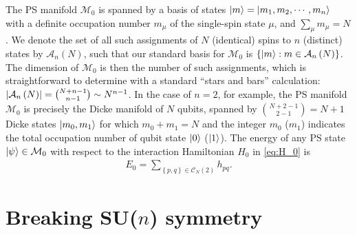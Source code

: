 \documentclass[nofootinbib,notitlepage,11pt]{revtex4-2}
\newcommand{\p}[1]{\left(#1\right)} %
\renewcommand{\set}[1]{\left\{#1\right\}} %
\newcommand{\1}{\mathds{1}}
\newcommand{\A}{\mathcal{A}}
\newcommand{\C}{\mathcal{C}}
\newcommand{\M}{\mathcal{M}}
\begin{document}
The PS manifold $\M_0$ is spanned by a basis of states
$\ket{m}=\ket{m_1,m_2,\cdots,m_n}$ with a definite occupation number
$m_\mu$ of the single-spin state $\mu$, and $\sum_\mu m_\mu=N$.  We
denote the set of all such assignments of $N$ (identical) spins to $n$
(distinct) states by $\A_n\p{N}$, such that our standard basis for
$\M_0$ is $\set{\ket{m}:m\in\A_n\p{N}}$.  The dimension of $\M_0$ is
then the number of such assignments, which is straightforward to
determine with a standard ``stars and bars'' calculation:
$\abs{\A_n\p{N}} = {N+n-1 \choose n-1} \sim N^{n-1}$.  In the case of
$n=2$, for example, the PS manifold $\M_0$ is precisely the Dicke
manifold\cite{dicke1954coherence} of $N$ qubits, spanned by
${N+2-1\choose2-1}=N+1$ Dicke states $\ket{m_0,m_1}$ for which
$m_0+m_1=N$ and the integer $m_0$ ($m_1$) indicates the total
occupation number of qubit state $\ket{0}$ ($\ket{1}$).  The energy of
any PS state $\ket\psi\in\M_0$ with respect to the interaction
Hamiltonian $H_0$ in \eqref{eq:H_0} is
\begin{align}
  E_0 = \sum_{\set{p,q}\in\C_N\p{2}} h_{pq}.
\end{align}

\section{Breaking SU($n$) symmetry}
\end{document}
